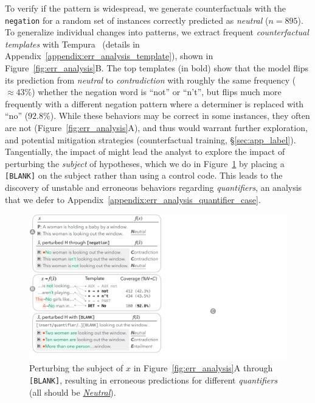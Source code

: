 To verify if the pattern is widespread, we generate counterfactuals with the \texttt{negation} \tagstr for a random set of instances correctly predicted as \emph{neutral} ($n=895$). To generalize individual changes into patterns, we extract frequent \emph{counterfactual templates} with Tempura~\cite{wu2020tempura} (details in Appendix~\ref{appendix:err_analysis_template}), shown in Figure~\ref{fig:err_analysis}B.
The top templates (in bold) show that the model flips its prediction from \emph{neutral} to \emph{contradiction} with roughly the same frequency (${\approx}43\%$) whether the negation word is ``not'' or ``n't'', but flips much more frequently with a different negation pattern where a determiner is replaced with ``no'' ($92.8\%$). While these behaviors may be correct in some instances, they often are not (\eg Figure~\ref{fig:err_analysis}A), and thus would warrant further exploration, and potential mitigation strategies (\eg counterfactual training, \S\ref{sec:app_label}).
Tangentially, the impact of  might lead the analyst to explore the impact of perturbing the \emph{subject} of hypotheses, which we do in Figure~\ref{fig:err_analysis_quantifier} by placing a \texttt{[BLANK]} on the subject rather than using a control code.
This leads to the discovery of unstable and erroneous behaviors regarding \emph{quantifiers}, an analysis that we defer to Appendix~\ref{appendix:err_analysis_quantifier_case}.


\begin{figure}[t]
\centering
\includegraphics[trim={0.5cm 1.5cm 32.5cm 25.5cm}, clip,width=1\columnwidth]{figures/err_analysis.pdf}
\vspace{-15pt}
\caption{
Perturbing the subject of $x$ in Figure~\ref{fig:err_analysis}A through \texttt{[BLANK]}, resulting in erroneous predictions for different \emph{quantifiers}
(all should be \uline{\emph{Neutral}}). 
}
\vspace{-10pt}
\label{fig:err_analysis_quantifier}
\end{figure}


